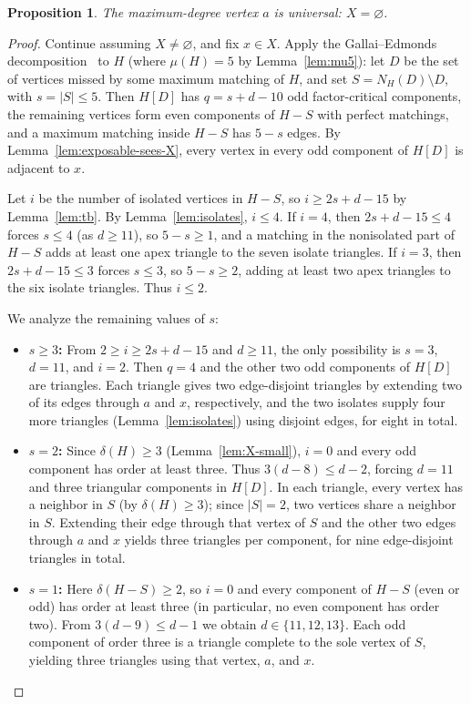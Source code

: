 \documentclass[11pt]{article}
\newtheorem{proposition}[theorem]{Proposition}
\begin{document}
\begin{proposition}\label{prop:universal}
The maximum-degree vertex $a$ is universal: $X=\varnothing$.
\end{proposition}

\begin{proof}
Continue assuming $X\neq\varnothing$, and fix $x\in X$. Apply the Gallai--Edmonds decomposition~\cite{Schrijver} to $H$ (where $\mu(H)=5$ by Lemma~\ref{lem:mu5}): let $D$ be the set of vertices missed by some maximum matching of $H$, and set $S=N_H(D)\setminus D$, with $s=|S|\leq 5$. Then $H[D]$ has $q=s+d-10$ odd factor-critical components, the remaining vertices form even components of $H-S$ with perfect matchings, and a maximum matching inside $H-S$ has $5-s$ edges. By Lemma~\ref{lem:exposable-sees-X}, every vertex in every odd component of $H[D]$ is adjacent to $x$.

Let $i$ be the number of isolated vertices in $H-S$, so $i\geq 2s+d-15$ by Lemma~\ref{lem:tb}. By Lemma~\ref{lem:isolates}, $i\leq 4$. If $i=4$, then $2s+d-15\leq 4$ forces $s\leq 4$ (as $d\geq 11$), so $5-s\geq 1$, and a matching in the nonisolated part of $H-S$ adds at least one apex triangle to the seven isolate triangles. If $i=3$, then $2s+d-15\leq 3$ forces $s\leq 3$, so $5-s\geq 2$, adding at least two apex triangles to the six isolate triangles. Thus $i\leq 2$.

We analyze the remaining values of $s$:
\begin{itemize}
\item \textbf{$s\geq 3$:} From $2\geq i\geq 2s+d-15$ and $d\geq 11$, the only possibility is $s=3$, $d=11$, and $i=2$. Then $q=4$ and the other two odd components of $H[D]$ are triangles. Each triangle gives two edge-disjoint triangles by extending two of its edges through $a$ and $x$, respectively, and the two isolates supply four more triangles (Lemma~\ref{lem:isolates}) using disjoint edges, for eight in total.
\item \textbf{$s=2$:} Since $\delta(H)\geq 3$ (Lemma~\ref{lem:X-small}), $i=0$ and every odd component has order at least three. Thus $3(d-8)\leq d-2$, forcing $d=11$ and three triangular components in $H[D]$. In each triangle, every vertex has a neighbor in $S$ (by $\delta(H)\geq 3$); since $|S|=2$, two vertices share a neighbor in $S$. Extending their edge through that vertex of $S$ and the other two edges through $a$ and $x$ yields three triangles per component, for nine edge-disjoint triangles in total.
\item \textbf{$s=1$:} Here $\delta(H-S)\geq 2$, so $i=0$ and every component of $H-S$ (even or odd) has order at least three (in particular, no even component has order two). From $3(d-9)\leq d-1$ we obtain $d\in\{11,12,13\}$. Each odd component of order three is a triangle complete to the sole vertex of $S$, yielding three triangles using that vertex, $a$, and $x$.


\end{itemize}
\end{proof}
\end{document}
